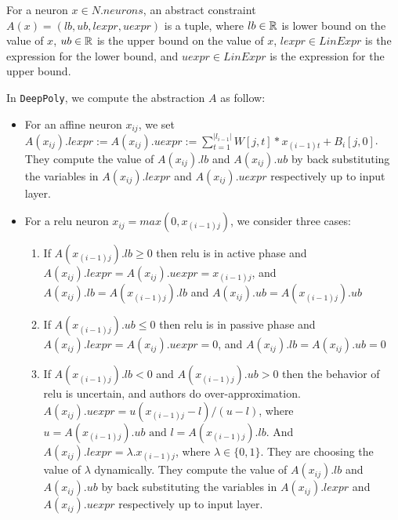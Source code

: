 \begin{df}
    For a neuron $x \in N.neurons$,
    an abstract constraint $A(x) = (lb,ub, lexpr, uexpr)$ is a tuple, where
    $lb \in \mathbb{R}$ is lower bound on the value of $x$,
    $ub \in \mathbb{R}$ is the upper bound on the value of  $x$,
    $lexpr \in LinExpr$ is the expression for the lower bound, and
    $uexpr \in LinExpr$ is the expression for the upper bound.
\end{df}


In \texttt{DeepPoly}, we compute the abstraction $A$ as follow:
\begin{itemize}
\item For an affine neuron $x_{ij}$, we set 
  $A(x_{ij}).lexpr := A(x_{ij}).uexpr := \sum_{t=1}^{|l_{i-1}|} W[j,t]*x_{(i-1)t} + B_i[j,0]$.
  They compute the value of $A(x_{ij}).lb$ and $A(x_{ij}).ub$ by back substituting
  the variables in $A(x_{ij}).lexpr$ and $A(x_{ij}).uexpr$ respectively up to input layer.  
\item For a relu neuron $x_{ij} = max(0,x_{(i-1)j})$, we consider three cases:
            \begin{enumerate}
                \item If $A(x_{(i-1)j}).lb \geq 0$ then relu is in active phase and $A(x_{ij}).lexpr = A(x_{ij}).uexpr = x_{(i-1)j}$,
                        and $A(x_{ij}).lb = A(x_{(i-1)j}).lb$ and $A(x_{ij}).ub = A(x_{(i-1)j}).ub$
                \item If $A(x_{(i-1)j}).ub \leq 0$ then relu is in passive phase and $A(x_{ij}).lexpr = A(x_{ij}).uexpr = 0$, 
                        and $A(x_{ij}).lb = A(x_{ij}).ub = 0$
                \item  If $A(x_{(i-1)j}).lb < 0$ and $A(x_{(i-1)j}).ub > 0$ then the behavior of relu is uncertain, and authors
                        do over-approximation. $A(x_{ij}).uexpr = u(x_{(i-1)j} - l) / (u - l)$, 
                        where $u = A(x_{(i-1)j}).ub \text{ and } l = A(x_{(i-1)j}).lb$.
                        And $A(x_{ij}).lexpr = \lambda . x_{(i-1)j}$, where $\lambda \in \{0,1\}$. 
                        They are choosing the value of $\lambda$ dynamically. They compute the value of $A(x_{ij}).lb$ and $A(x_{ij}).ub$ 
                        by back substituting the variables in $A(x_{ij}).lexpr$ and $A(x_{ij}).uexpr$ respectively up to input layer. 
            \end{enumerate} 
\end{itemize}

